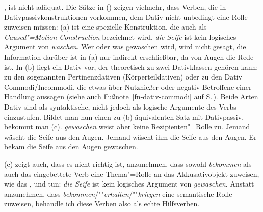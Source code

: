 \parencites[369]{Eroms78}[21]{Haider86}[144]{Eisenberg94a}[228]{HM94a}[221--222]{Kathol2000a}[]{Gunkel2003b},
ist nicht adäquat.
Die Sätze in () zeigen vielmehr, dass Verben, die in Dativpassivkonstruktionen
vorkommen, dem Dativ nicht unbedingt eine Rolle zuweisen müssen:
(a) ist eine spezielle Konstruktion, die auch als \emph{Caused"=Motion
Construction} bezeichnet wird. \emph{die Seife} ist kein logisches
Argument von \emph{waschen}. Wer oder was gewaschen wird, wird nicht gesagt,
die Information darüber ist in (a) nur indirekt erschließbar, da
von Augen die Rede ist. In (b) liegt ein Dativ vor, der theoretisch
zu zwei Dativklassen gehören kann: zu den sogenannten Pertinenzdativen
(Körperteildativen) oder zu den Dativ Commodi/Incommodi,
die etwas über Nutznießer oder negativ Betroffene einer Handlung aussagen
(siehe auch Fußnote~\ref{fn-dativ-commodi} auf S.\,\pageref{fn-dativ-commodi}). Beide Arten
Dativ sind als syntaktische, nicht jedoch als logische Argumente des Verbs einzustufen.
Bildet man nun einen zu (b) äquivalenten Satz mit Dativpassiv,
bekommt man (c). \emph{gewaschen} weist aber keine Rezipienten"=Rolle zu.
\eal
\label{ex-bekommen-passive-und-waschen}
\ex Jemand wäscht     die Seife aus den Augen.
\ex Jemand wäscht ihm die Seife aus den Augen.
\ex\label{ex-er-bekam-die-seife-aus-den-augen-gewaschen}
Er bekam die Seife aus den Augen gewaschen.
\zl

\noindent
(c) zeigt auch, dass es nicht richtig ist, anzunehmen, dass sowohl \emph{bekommen} als auch das
eingebettete Verb eine Thema"=Rolle an das Akkusativobjekt zuweisen,
wie das \citet[]{Haider86}, \citet[]{HM94a}
und \citet[]{Kathol2000a} tun: \emph{die Seife} ist kein logisches
Argument von \emph{gewaschen}.
Anstatt anzunehmen, dass \emph{bekommen}/""\emph{erhalten}/""\emph{kriegen} 
eine semantische Rolle zuweisen, behandle ich diese Verben also als echte Hilfsverben.



